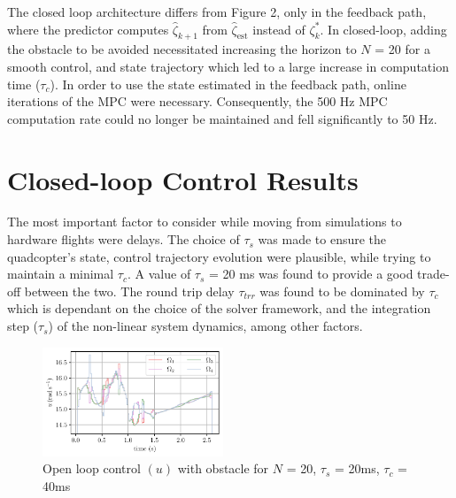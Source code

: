 \documentclass[conference]{IEEEtran}
\begin{document}
The closed loop architecture differs from Figure 2, only in the feedback path, where the predictor computes $\hat{\zeta}_{k+1}$ from $\hat{\zeta}_{\mathrm{est}}$ instead of $\zeta^*_{k}$.
In closed-loop, adding the obstacle to be avoided necessitated increasing the horizon to $N$ = 20 for a smooth control, and state trajectory which led to a large increase in computation time ($\tau_c$). In order to use the state estimated in the feedback path, online iterations of the MPC were necessary. Consequently, the 500 Hz MPC computation rate could no longer be maintained and fell significantly to 50 Hz.

\section{Closed-loop Control Results}\label{Section6}

The most important factor to consider while moving from simulations to hardware flights were delays. The choice of 
$\tau_s$ was made to ensure the quadcopter's state, control trajectory evolution were plausible, while trying to maintain a minimal $\tau_c$. A value of $\tau_s$ = 20 ms was found to provide a good trade-off between the two. 
The round trip delay $\tau_{trr}$ was found to be dominated by $\tau_{c}$ which is dependant on the choice of the solver framework, and the integration step ($\tau_s$) of the non-linear system dynamics, among other factors.


\begin{figure}[t!]
    \includegraphics[width=0.48\textwidth]{figures/u.pdf}
    \caption{Open loop control $(u)$ with obstacle for $N$ = 20, $\tau_s$ = 20ms, $\tau_c$ = 40ms}  \label{fig_comp_zeta_u_AGV}
\end{figure}
\end{document}
